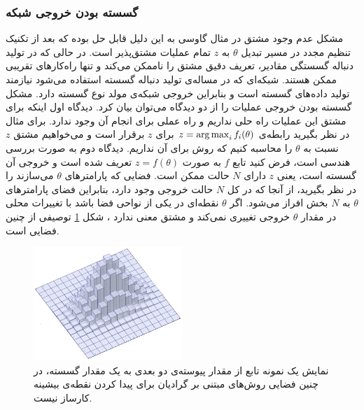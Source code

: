 \subsubsection{گسسته بودن خروجی شبکه}
مشکل عدم وجود مشتق در مثال گاوسی به این دلیل قابل حل بوده که بعد از تکنیک تنظیم مجدد در مسیر تبدیل $\theta$ به $z$ تمام عملیات مشتق‌پذیر است.
در حالی که در تولید دنباله گسستگی مقادیر، تعریف دقیق مشتق را ناممکن می‌کند و تنها راه‌کارهای تقریبی ممکن هستند. شبکه‌ا‌ی که در مساله‌ی تولید دنباله گسسته استفاده می‌شود نیازمند تولید داده‌های گسسته است و بنابراین خروجی شبکه‌ی مولد نوع گسسته دارد.
\newline
مشکل گسسته بودن خروجی عملیات را از دو دیدگاه می‌توان بیان کرد.
دیدگاه اول اینکه برای مشتق این عملیات راه حلی نداریم و راه عملی برای انجام آن وجود ندارد. برای مثال در نظر بگیرید رابطه‌ی 
${z = \operatorname*{arg\,max}_i f_i(\theta)}$
برای $z$ برقرار است و می‌خواهیم مشتق $z$ نسبت به $\theta$ را محاسبه کنیم که روش برای آن نداریم.
دیدگاه دوم به صورت بررسی هندسی است، فرض کنید تابع $f$ به صورت 
${z=f(\theta)}$
تعریف شده است و خروجی آن گسسته است، یعنی $z$ دارای $N$ حالت ممکن است. فضایی که پارامتر‌های 
$\theta$
می‌سازند را در نظر بگیرید، از آنجا که در کل $N$ حالت خروجی وجود دارد، بنابراین فضای پارامتر‌های $\theta$ به $N$ بخش افراز می‌شود. اگر $\theta$ نقطه‌ای در یکی از نواحی فضا باشد با تغییرات محلی در مقدار $\theta$ خروجی تغییری نمی‌کند و مشتق معنی ندارد
\cite{SeqGAN}
، شکل 
\ref{Figure:DiscreteSpace}
توصیفی از چنین فضایی است.
\begin{figure}[!htb]
	\centering
	\includegraphics[width=0.5\textwidth]{images/DiscreteSpace.png} 
	\caption[ نمایش یک نمونه تابع از مقدار پیوسته‌ی دو بعدی به یک مقدار گسسته]
	{
		نمایش یک نمونه تابع از مقدار پیوسته‌ی دو بعدی به یک مقدار گسسته، در چنین فضایی روش‌های مبتنی بر گرادیان برای پیدا کردن نقطه‌ی بیشینه کارساز نیست.
	}
	\label{Figure:DiscreteSpace}
\end{figure}
